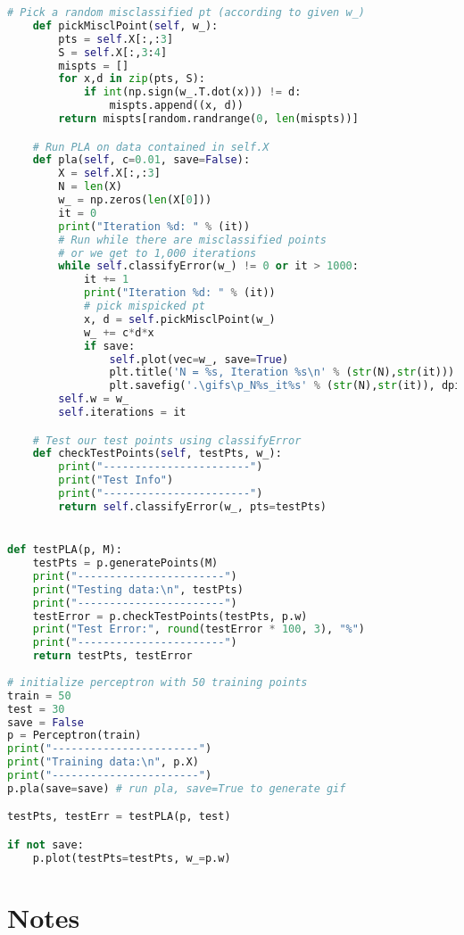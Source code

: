 \documentclass{article}
\begin{document}
\begin{lstlisting}[language=Python,breaklines=true,basicstyle=\small]
    # Pick a random misclassified pt (according to given w_)
    def pickMisclPoint(self, w_):
        pts = self.X[:,:3]
        S = self.X[:,3:4]
        mispts = []
        for x,d in zip(pts, S):
            if int(np.sign(w_.T.dot(x))) != d:
                mispts.append((x, d))
        return mispts[random.randrange(0, len(mispts))]

    # Run PLA on data contained in self.X
    def pla(self, c=0.01, save=False):
        X = self.X[:,:3]
        N = len(X)
        w_ = np.zeros(len(X[0]))
        it = 0
        print("Iteration %d: " % (it))
        # Run while there are misclassified points
        # or we get to 1,000 iterations
        while self.classifyError(w_) != 0 or it > 1000:
            it += 1
            print("Iteration %d: " % (it))
            # pick mispicked pt
            x, d = self.pickMisclPoint(w_)
            w_ += c*d*x
            if save:
                self.plot(vec=w_, save=True)
                plt.title('N = %s, Iteration %s\n' % (str(N),str(it)))
                plt.savefig('.\gifs\p_N%s_it%s' % (str(N),str(it)), dpi=100, bbox_inches='tight')
        self.w = w_
        self.iterations = it

    # Test our test points using classifyError
    def checkTestPoints(self, testPts, w_):
        print("-----------------------")
        print("Test Info")
        print("-----------------------")
        return self.classifyError(w_, pts=testPts)


def testPLA(p, M):
    testPts = p.generatePoints(M)
    print("-----------------------")
    print("Testing data:\n", testPts)
    print("-----------------------")
    testError = p.checkTestPoints(testPts, p.w)
    print("Test Error:", round(testError * 100, 3), "%")
    print("-----------------------")
    return testPts, testError
    
# initialize perceptron with 50 training points
train = 50
test = 30
save = False
p = Perceptron(train)
print("-----------------------")
print("Training data:\n", p.X)
print("-----------------------")
p.pla(save=save) # run pla, save=True to generate gif

testPts, testErr = testPLA(p, test)

if not save:
    p.plot(testPts=testPts, w_=p.w)


\end{lstlisting}
\newpage
\section*{Notes}
\end{document}
